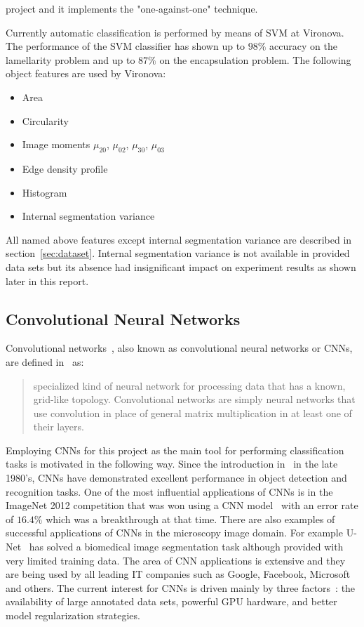 \documentclass[a4paper, 11pt, table]{article}
\begin{document}
 project and it implements the "one-against-one" technique.

Currently automatic classification is performed by means of SVM at Vironova. The performance of the SVM classifier has shown up to $98\%$ accuracy on the lamellarity problem and up to $87\%$ on the encapsulation problem. The following object features are used by Vironova:
\begin{itemize}
\item Area
\item Circularity
\item Image moments $\mu_{20}$, $\mu_{02}$, $\mu_{30}$, $\mu_{03}$
\item Edge density profile
\item Histogram
\item Internal segmentation variance
\end{itemize}

All named above features except internal segmentation variance are described in section~\ref{sec:dataset}. Internal segmentation variance is not available in provided data sets but its absence had insignificant impact on experiment results as shown later in this report.  

\subsection{Convolutional Neural Networks}
Convolutional networks~\cite{LeCun1986}, also known as convolutional neural networks or CNNs, are defined in~\cite{dl_book} as: \blockquote{specialized kind of neural network for processing data that has a known, grid-like topology. Convolutional networks are simply neural networks that use convolution in place of general matrix multiplication in at least one of their layers.}

Employing CNNs for this project as the main tool for performing classification tasks is motivated in the following way. Since the introduction in~\cite{LeCun1986} in the late 1980's, CNNs have demonstrated excellent performance in object detection and recognition tasks. One of the most influential applications of CNNs is in the ImageNet 2012 competition that was won using a CNN model~\cite{NIPS2012_4824} with an error rate of $16.4\%$ which was a breakthrough at that time. There are also examples of successful applications of CNNs in the microscopy image domain. For example U-Net~\cite{Ronneberger2015} has solved a biomedical image segmentation task although provided with very limited training data. The area of CNN applications is extensive and they are being used by all leading IT companies such as Google, Facebook, Microsoft and others. The current interest for CNNs is driven mainly by three factors~\cite{Zeiler2014}: the availability of large annotated data sets, powerful GPU hardware, and better model regularization strategies. 
\end{document}
